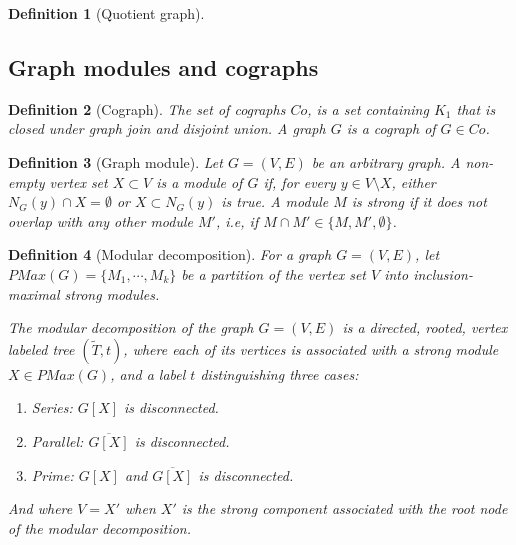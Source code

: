 \documentclass{amsart}
\newtheorem{definition}{Definition}[section]
\begin{document}
\begin{definition}[Quotient graph]

\end{definition}

\subsection{Graph modules and cographs}
\label{sec:GraphModules}

\begin{definition}[Cograph]
    The set of cographs $Co$, is a set containing $K_1$ that is closed under 
    graph join and disjoint union. A graph $G$ is a cograph of $G \in Co$.
\end{definition}


\begin{definition}[Graph module]
    Let $G = (V,E)$ be an arbitrary graph. A non-empty vertex set $X \subset V$
    is a module of $G$ if, for every $y \in V \setminus X$,  either
    $N_G(y) \cap X = \emptyset$ or $X \subset N_G(y)$ is true. A module $M$ is
    strong if it does not overlap with any other module $M'$, i.e, if 
    $M \cap M' \in \{M,M',\emptyset \}$.
\end{definition}
  

\begin{definition}[Modular decomposition]
    For a graph $G = (V,E)$, let $PMax(G) = \{M_1,\cdots,M_k\}$ be a partition of the vertex set $V$ 
    into inclusion-maximal strong modules.
    
    The modular decomposition of the graph $G = (V,E)$ is a directed, rooted, vertex labeled tree
    $(\widetilde{T},t)$, where each of its vertices is associated with a strong
    module $X \in PMax(G)$, and a label $t$ distinguishing  three cases:

    \begin{enumerate}
        \item Series: $G[X]$ is disconnected.
        \item Parallel: $\overline{G[X]}$ is disconnected.
        \item Prime: $G[X]$ and $\overline{G[X]}$ is disconnected.
    \end{enumerate}

    And where $V = X'$ when $X'$ is the strong component associated with the
    root node of the modular decomposition.
\end{definition}
\end{document}
